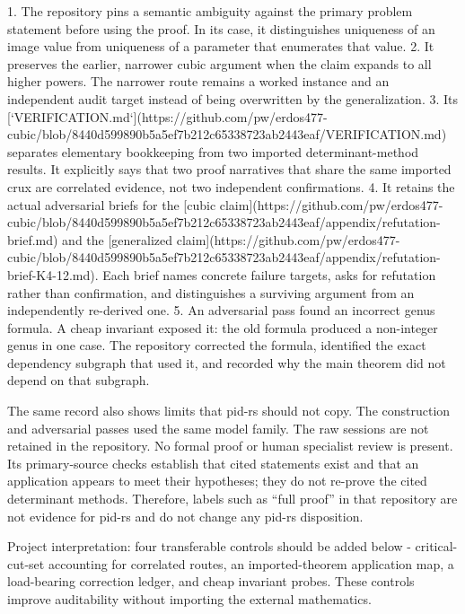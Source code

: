 \documentclass[11pt]{article}
\begin{document}
\begin{markdown}
1. The repository pins a semantic ambiguity against the primary problem statement before using the
   proof. In its case, it distinguishes uniqueness of an image value from uniqueness of a
   parameter that enumerates that value.
2. It preserves the earlier, narrower cubic argument when the claim expands to all higher powers.
   The narrower route remains a worked instance and an independent audit target instead of being
   overwritten by the generalization.
3. Its [`VERIFICATION.md`](https://github.com/pw/erdos477-cubic/blob/8440d599890b5a5ef7b212c65338723ab2443eaf/VERIFICATION.md)
   separates elementary bookkeeping from two imported determinant-method results. It explicitly
   says that two proof narratives that share the same imported crux are correlated evidence, not
   two independent confirmations.
4. It retains the actual adversarial briefs for the
   [cubic claim](https://github.com/pw/erdos477-cubic/blob/8440d599890b5a5ef7b212c65338723ab2443eaf/appendix/refutation-brief.md)
   and the
   [generalized claim](https://github.com/pw/erdos477-cubic/blob/8440d599890b5a5ef7b212c65338723ab2443eaf/appendix/refutation-brief-K4-12.md).
   Each brief names concrete failure targets, asks for refutation rather than confirmation, and
   distinguishes a surviving argument from an independently re-derived one.
5. An adversarial pass found an incorrect genus formula. A cheap invariant exposed it: the old
   formula produced a non-integer genus in one case. The repository corrected the formula,
   identified the exact dependency subgraph that used it, and recorded why the main theorem did
   not depend on that subgraph.

The same record also shows limits that pid-rs should not copy. The construction and adversarial
passes used the same model family. The raw sessions are not retained in the repository. No formal
proof or human specialist review is present. Its primary-source checks establish that cited
statements exist and that an application appears to meet their hypotheses; they do not re-prove
the cited determinant methods. Therefore, labels such as “full proof” in that repository are not
evidence for pid-rs and do not change any pid-rs disposition.

Project interpretation: four transferable controls should be added below - critical-cut-set
accounting for correlated routes, an imported-theorem application map, a load-bearing correction
ledger, and cheap invariant probes. These controls improve auditability without importing the
external mathematics.


\end{markdown}
\end{document}
